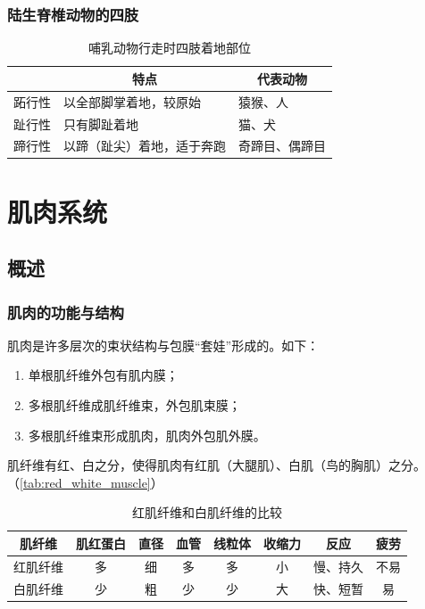\subsubsection{陆生脊椎动物的四肢}

\begin{table}[h]
	\centering
	\begin{tabularx}{\textwidth}{|>{\centering\arraybackslash}m{6em}|X|X|}
		\hline
		\multicolumn{1}{|c|}{\textbf{四肢着地方式}} & \multicolumn{1}{c|}{\textbf{特点}} & \multicolumn{1}{c|}{\textbf{代表动物}} \\ \hline
		跖行性 & 以全部脚掌着地，较原始 & 猿猴、人 \\ \hline
		趾行性 & 只有脚趾着地 & 猫、犬 \\ \hline
		蹄行性 & 以蹄（趾尖）着地，适于奔跑 & 奇蹄目、偶蹄目 \\ \hline
	\end{tabularx}
	\caption{哺乳动物行走时四肢着地部位}
	\label{tab:mammal_walk}
\end{table}







\section{肌肉系统}

\subsection{概述}

\subsubsection{肌肉的功能与结构}

肌肉是许多层次的束状结构与包膜“套娃”形成的。如下：

\begin{enumerate}
	\item 单根肌纤维外包有肌内膜；
	\item 多根肌纤维成肌纤维束，外包肌束膜；
	\item 多根肌纤维束形成肌肉，肌肉外包肌外膜。
\end{enumerate}

肌纤维有红、白之分，使得肌肉有红肌（大腿肌）、白肌（鸟的胸肌）之分。（\autoref{tab:red_white_muscle}）

\begin{table}[htbp]
	\centering
	\begin{tabularx}{\textwidth}{|C|C|c|c|c|c|C|c|}
		\hline
		\textbf{肌纤维} & \textbf{肌红蛋白} & \textbf{直径} & \textbf{血管} & \textbf{线粒体} & \textbf{收缩力} & \textbf{反应} & \textbf{疲劳} \\ \hline
		红肌纤维 & 多 & 细 & 多 & 多 & 小 & 慢、持久 & 不易 \\ \hline
		白肌纤维 & 少 & 粗 & 少 & 少 & 大 & 快、短暂 & 易 \\ \hline
	\end{tabularx}
	\caption{红肌纤维和白肌纤维的比较}
	\label{tab:red_white_muscle}
\end{table}



